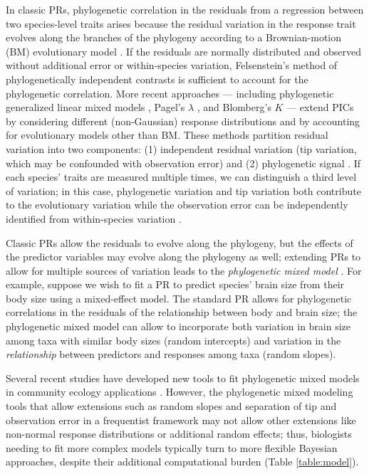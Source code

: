 \documentclass[12pt]{article}
\begin{document}
In classic PRs, phylogenetic correlation in the residuals from a regression between two species-level traits arises because the residual variation in the response trait evolves along the branches of the phylogeny according to a Brownian-motion (BM) evolutionary model \citep{felsenstein1985phylogenies}. 
If the residuals are normally distributed and observed without additional error or within-species variation, Felsenstein's method of phylogenetically independent contrasts  \citep[PICS:][]{felsenstein1985phylogenies} is sufficient to account for the phylogenetic correlation.
More recent approaches --- including phylogenetic generalized linear mixed models  \citep[PGLMM:][]{ives2011generalized, housworth2004phylogenetic}, Pagel's $\lambda$ \citep{pagel1999inferring}, and Blomberg's $K$ \citep{blomberg2003testing} --- extend PICs by considering different (non-Gaussian) response distributions and by accounting for evolutionary models other than BM.
These methods partition residual variation into two components: (1) independent residual variation (tip variation, which may be confounded with observation error) and (2) phylogenetic signal  \citep[evolutionary process error:][]{hansen2012interpreting, housworth2004phylogenetic}.
If each species' traits are measured multiple times, we can distinguish a third level of variation; in this case, phylogenetic variation and tip variation both contribute to the evolutionary variation while the observation error can be independently identified from within-species variation \citep{kostikova2016bridging, devillemereuil2012bayesian}.

Classic PRs allow the residuals to evolve along the phylogeny, but the effects of the predictor variables may evolve along the phylogeny as well; extending PRs to allow for multiple sources of variation leads to the  \emph{phylogenetic mixed model} \citep{housworth2004phylogenetic}.
For example, suppose we wish to fit a PR to predict species' brain size from their body size \cite{felsenstein1985phylogenies} using a mixed-effect model.
The standard PR allows for phylogenetic correlations in the residuals of the relationship between body and brain size; the phylogenetic mixed model can allow to incorporate both
variation in brain size among taxa with similar body sizes (random intercepts) and
variation in the \emph{relationship} between predictors and responses among taxa (random slopes).

Several recent studies have developed new tools to fit phylogenetic mixed models in
community ecology applications \citep{nowakowski2018phylogenetic, li2017canfun}.
However, the phylogenetic mixed modeling tools that allow extensions such as random slopes
and separation of tip and observation error in a frequentist framework may not allow other extensions like non-normal response distributions or additional random effects; thus, biologists needing to fit more complex models typically turn to more flexible Bayesian approaches, despite their additional computational burden \citep{hadfield2010mcmc, burkner2018brms, kostikova2016bridging} (Table \ref{table:model}).
\end{document}
